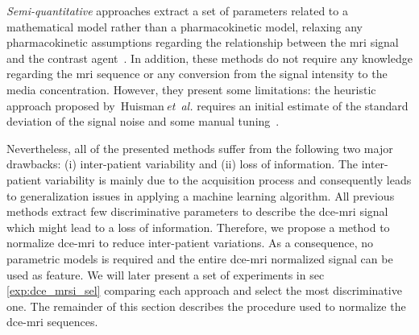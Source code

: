 \documentclass[final,3p,times,twocolumn]{elsarticle}
\begin{document}
\emph{Semi-quantitative} approaches extract a set of parameters related to a
mathematical model rather than a pharmacokinetic model, relaxing any
pharmacokinetic assumptions regarding the relationship between the \ac{mri}
signal and the contrast
agent~\cite{huisman2001accurate,gliozzi2011phenomenological}. In addition,
these methods do not require any knowledge regarding the \ac{mri} sequence or
any conversion from the signal intensity to the media concentration. However,
they present some limitations: the heuristic approach proposed
by~Huisman\,\emph{et~al.}  requires an initial estimate of the standard
deviation of the signal noise and some manual
tuning~\cite{huisman2001accurate}.

Nevertheless, all of the presented methods suffer from the following two major
drawbacks: (i) inter-patient variability and (ii) loss of information. The
inter-patient variability is mainly due to the acquisition process and
consequently leads to generalization issues in applying a machine learning
algorithm. All previous methods extract few discriminative parameters to
describe the \ac{dce}-\ac{mri} signal which might lead to a loss of
information. Therefore, we propose a method to normalize \ac{dce}-\ac{mri} to
reduce inter-patient variations. As a consequence, no parametric models is
required and the entire \ac{dce}-\ac{mri} normalized signal can be used as
feature. We will later present a set of experiments in
\acs{sec}\,\ref{exp:dce_mrsi_sel} comparing each approach and select the most
discriminative one. The remainder of this section describes the procedure used
to normalize the \ac{dce}-\ac{mri} sequences.
\end{document}
